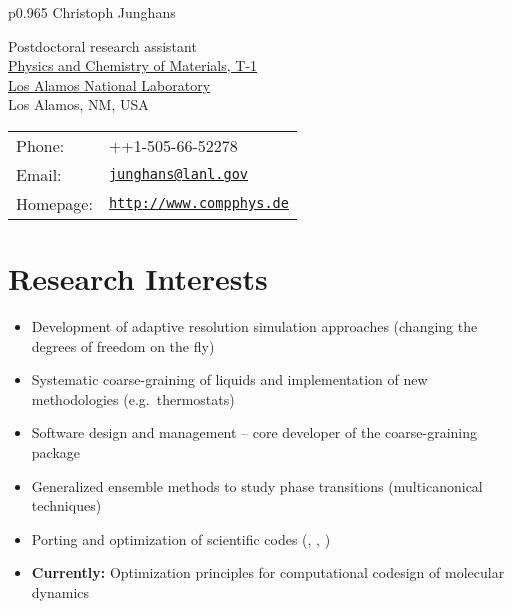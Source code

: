 \documentclass{article}
\begin{document}
\vspace*{-1.2cm}

\begin{tabular}{p{0.965\textwidth}}
{\huge Christoph Junghans}\\
\hline
\end{tabular}
\vspace{0.2in}

\begin{minipage}{0.45\linewidth}
  Postdoctoral research assistant\\
  \href{http://www.lanl.gov/orgs/t/t1.shtml} {Physics and Chemistry of Materials, T-1}\\
  \href{http://www.lanl.gov}{Los Alamos National Laboratory} \\
  Los Alamos, NM, USA
\end{minipage}
\begin{minipage}{0.45\linewidth}
  \begin{tabular}{ll}
    Phone: & ++1-505-66-52278 \\
    Email: & \href{mailto:junghans@lanl.gov}{\tt junghans@lanl.gov} \\
    Homepage: & \href{http://www.compphys.de}{\tt http://www.compphys.de} \\
  \end{tabular}
\end{minipage}

\vspace{-1mm}
\section*{Research Interests}
\vspace{-1mm}
\begin{itemize}
\setlength{\itemsep}{0pt}
\setlength{\parskip}{0pt}
\setlength{\parsep}{0pt}
\item Development of adaptive resolution simulation approaches (changing the degrees of freedom on the fly)
\item Systematic coarse-graining of liquids and implementation of new methodologies (e.g.\ thermostats)
\item Software design and management -- core developer of the coarse-graining package 
\item Generalized ensemble methods to study phase transitions (multicanonical techniques)
\item Porting and optimization of scientific codes (, , )
\item \textbf{Currently:} Optimization principles for computational codesign of molecular dynamics
\end{itemize}
\end{document}
